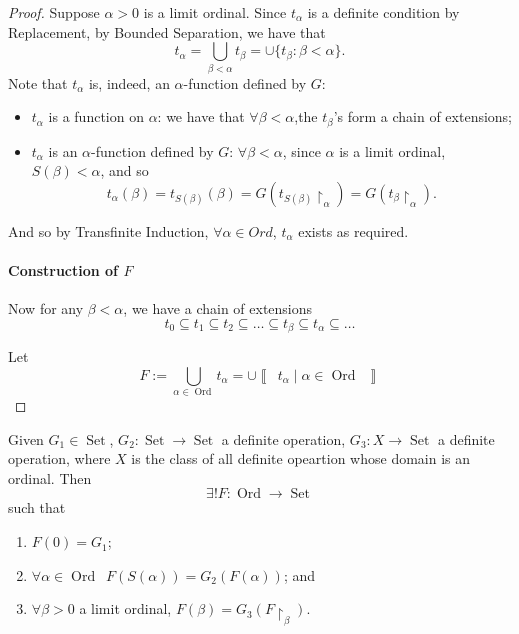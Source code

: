 \documentclass[notoc,notitlepage]{tufte-book}
\newcommand{\class}[1]{\left\llbracket \enspace #1 \enspace \right\rrbracket}
\DeclareMathOperator{\Ord}{Ord }
\DeclareMathOperator{\Set}{Set }
\begin{document}
\begin{proof}
  Suppose $\alpha > 0$ is a limit ordinal. Since $t_\alpha$ is a definite condition by Replacement, by Bounded Separation, we have that
  \begin{equation*}
    t_\alpha = \bigcup_{\beta < \alpha} t_\beta = \cup \{ t_\beta : \beta < \alpha \}.
  \end{equation*}
  Note that $t_\alpha$ is, indeed, an $\alpha$-function defined by $G$:
  \begin{itemize}
    \item $t_\alpha$ is a function on $\alpha$: we have that $\forall \beta < \alpha$,the $t_\beta$'s form a chain of extensions;
    \item $t_\alpha$ is an $\alpha$-function defined by $G$: $\forall \beta < \alpha$, since $\alpha$ is a limit ordinal, $S(\beta) < \alpha$, and so
      \begin{equation*}
        t_\alpha(\beta) = t_{S(\beta)}(\beta) = G(t_{S(\beta)} \restriction_\alpha) = G(t_\beta \restriction_\alpha).
      \end{equation*}
  \end{itemize}
  And so by Transfinite Induction, $\forall \alpha \in Ord$, $t_\alpha$ exists as required.

  \paragraph{Construction of $F$} Now for any $\beta < \alpha$, we have a chain of extensions
  \begin{equation*}
    t_0 \subseteq t_1 \subseteq t_2 \subseteq \hdots \subseteq t_\beta \subseteq t_\alpha \subseteq \hdots
  \end{equation*}

  Let
  \begin{equation*}
    F := \bigcup_{\alpha \in \Ord} t_\alpha = \cup \class{ t_\alpha \mid \alpha \in \Ord }
  \end{equation*}
\end{proof}

\begin{crly}
\label{crly:transfinite_recursion_v2}
  Given $G_1 \in \Set$, $G_2 : \Set \to \Set$ a definite operation, $G_3 : X \to \Set$ a definite operation, where $X$ is the class of all definite opeartion whose domain is an ordinal. Then
  \begin{equation*}
    \exists ! F : \Ord \to \Set
  \end{equation*}
  such that
  \begin{enumerate}
    \item $F(0) = G_1$;
    \item $\forall \alpha \in \Ord \enspace F(S(\alpha)) = G_2(F(\alpha))$; and
    \item $\forall \beta > 0$ a limit ordinal, $F(\beta) = G_3(F\restriction_\beta)$.
  \end{enumerate}
\end{crly}
\end{document}
